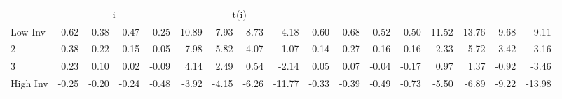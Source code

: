 \begin{table}[!ht]
\begin{tabular}{lrrrrrrrrrrrrrrrr}
      & \multicolumn{4}{c}{i} & \multicolumn{4}{c}{t(i)}
    
    \\
      \cmidrule(r){2-5} \cmidrule(r){6-9} \cmidrule(r){10-13} \cmidrule(r){14-17}

    Low Inv   & 0.62  & 0.38  & 0.47  & 0.25  & 10.89  & 7.93  & 8.73  & 4.18  & 0.60  & 0.68  & 0.52  & 0.50  & 11.52  & 13.76  & 9.68  & 9.11  \\
           2  & 0.38  & 0.22  & 0.15  & 0.05  & 7.98  & 5.82  & 4.07  & 1.07  & 0.14  & 0.27  & 0.16  & 0.16  & 2.33  & 5.72  & 3.42  & 3.16  \\
           3  & 0.23  & 0.10  & 0.02  & -0.09  & 4.14  & 2.49  & 0.54  & -2.14  & 0.05  & 0.07  & -0.04  & -0.17  & 0.97  & 1.37  & -0.92  & -3.46  \\
    High Inv  & -0.25  & -0.20  & -0.24  & -0.48  & -3.92  & -4.15  & -6.26  & -11.77  & -0.33  & -0.39  & -0.49  & -0.73  & -5.50  & -6.89  & -9.22  & -13.98  \\

  

  \bottomrule
\end{tabular}
\label{tbl:32_Size_OP_Inv_B16b}
\end{table}